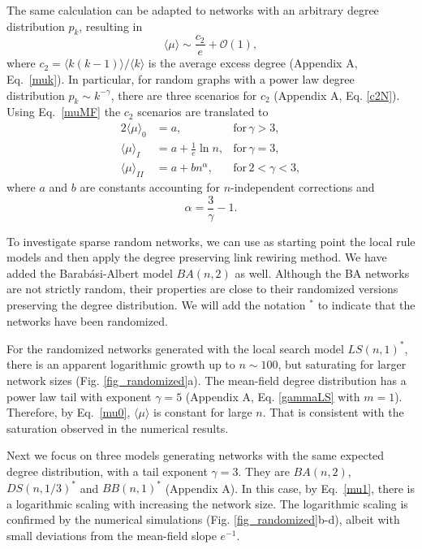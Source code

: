 \documentclass[reprint,aps,pre,amsmath,amssymb,superscriptaddress,showpacs]{revtex4-1}
\begin{document}
The same calculation can be adapted to networks with an arbitrary degree distribution $p_k$, resulting in 
%
\begin{equation}
\langle \mu\rangle \sim \frac{c_2}{e} + \mathcal{O}(1),
\label{muMF}
\end{equation}
%
where $c_2 = \langle k(k-1)\rangle/\langle k\rangle$ is the average excess degree  (Appendix A, Eq.~\eqref{muk}). In particular, for random graphs with a power law degree distribution $p_k\sim k^{-\gamma}$, there are three scenarios for $c_2$ (Appendix A, Eq. \eqref{c2N}). Using Eq.~\eqref{muMF} the $c_2$ scenarios are translated to
%
\begin{alignat}{2}
\langle \mu\rangle_{0}  &= a, &\text{for}\, \gamma>3,
\label{mu0}\\
%
\langle \mu\rangle_{I}  &= a + \frac{1}{e} \ln n, &\text{for}\,  \gamma=3,
\label{mu1}\\
%
\langle \mu\rangle_{II}  &= a + b n^{\alpha}, &\text{for}\, 2<\gamma<3,
\label{mu2}
\end{alignat}
%
where $a$ and $b$ are constants accounting for $n$-independent corrections and
%
\begin{equation}
\alpha = \frac{3}{\gamma} - 1.
\label{alpha}
\end{equation}

To investigate sparse random networks, we can use as starting point the local rule models and then apply the degree preserving link rewiring method. We have added the Barab\'asi-Albert model $BA(n,2)$ as well. Although the BA networks are not strictly random, their properties are close to their randomized versions preserving the degree distribution. We will add the notation $^*$ to indicate that the networks have been randomized.

For the randomized networks generated with the local search model $LS(n, 1)^*$, there is an apparent logarithmic growth up to $n\sim 100$, but saturating for larger network sizes (Fig. \ref{fig_randomized}a). The mean-field degree distribution has a power law tail with exponent $\gamma=5$ (Appendix A, Eq. \eqref{gammaLS} with $m=1$). Therefore, by Eq.~\eqref{mu0}, $\langle \mu\rangle$ is constant for large $n$. That is consistent with the saturation observed in the numerical results.

Next we focus on three models generating networks with the same expected degree distribution, with a tail exponent $\gamma=3$.  They are $BA(n,2)$, $DS(n, 1/3)^*$ and $BB(n, 1)^*$ (Appendix A). In this case, by Eq.~\eqref{mu1}, there is a logarithmic scaling with increasing the network size. The logarithmic scaling is confirmed by the numerical simulations (Fig. \ref{fig_randomized}b-d), albeit with small deviations from the mean-field slope $e^{-1}$.
\end{document}
